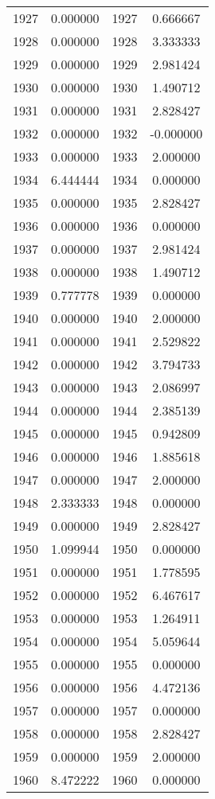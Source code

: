 \documentclass[12pt]{article}
\begin{document}
\begin{longtable}{@{}cccc@{}}
1927 & 0.000000 & 1927 & 0.666667 \\
1928 & 0.000000 & 1928 & 3.333333 \\
1929 & 0.000000 & 1929 & 2.981424 \\
1930 & 0.000000 & 1930 & 1.490712 \\
1931 & 0.000000 & 1931 & 2.828427 \\
1932 & 0.000000 & 1932 & -0.000000 \\
1933 & 0.000000 & 1933 & 2.000000 \\
1934 & 6.444444 & 1934 & 0.000000 \\
1935 & 0.000000 & 1935 & 2.828427 \\
1936 & 0.000000 & 1936 & 0.000000 \\
1937 & 0.000000 & 1937 & 2.981424 \\
1938 & 0.000000 & 1938 & 1.490712 \\
1939 & 0.777778 & 1939 & 0.000000 \\
1940 & 0.000000 & 1940 & 2.000000 \\
1941 & 0.000000 & 1941 & 2.529822 \\
1942 & 0.000000 & 1942 & 3.794733 \\
1943 & 0.000000 & 1943 & 2.086997 \\
1944 & 0.000000 & 1944 & 2.385139 \\
1945 & 0.000000 & 1945 & 0.942809 \\
1946 & 0.000000 & 1946 & 1.885618 \\
1947 & 0.000000 & 1947 & 2.000000 \\
1948 & 2.333333 & 1948 & 0.000000 \\
1949 & 0.000000 & 1949 & 2.828427 \\
1950 & 1.099944 & 1950 & 0.000000 \\
1951 & 0.000000 & 1951 & 1.778595 \\
1952 & 0.000000 & 1952 & 6.467617 \\
1953 & 0.000000 & 1953 & 1.264911 \\
1954 & 0.000000 & 1954 & 5.059644 \\
1955 & 0.000000 & 1955 & 0.000000 \\
1956 & 0.000000 & 1956 & 4.472136 \\
1957 & 0.000000 & 1957 & 0.000000 \\
1958 & 0.000000 & 1958 & 2.828427 \\
1959 & 0.000000 & 1959 & 2.000000 \\
1960 & 8.472222 & 1960 & 0.000000 \\

\end{longtable}
\end{document}
